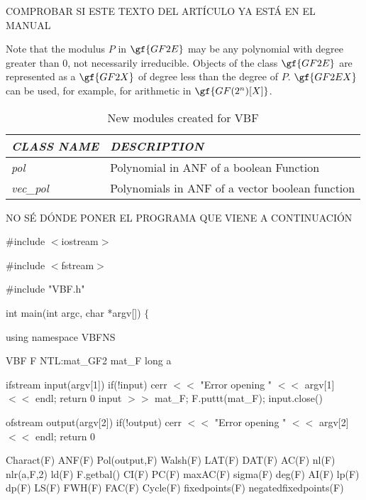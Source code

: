 {{{{{{{COMPROBAR SI ESTE TEXTO DEL ART\'ICULO YA EST\'A EN EL MANUAL


Note that the modulus $P$ in $\gf{GF2E}$ may be any polynomial with degree
greater than $0$, not necessarily irreducible. Objects of the class $\gf{GF2E}$ are
represented as a $\gf{GF2X}$ of degree less than the degree of $P$. $\gf{GF2EX}$
can be used, for example, for arithmetic in $\gf{GF(2^n)[X]}$. 

\begin{table}[htbp]%
\caption{New modules created for VBF\label{tab:NewModules}}{
\begin{tabular}{|l|l|}
\hline
\em{CLASS NAME} & \em{DESCRIPTION} \\\hline
\textsl{pol} & Polynomial in ANF of a boolean Function \\\hline
\textsl{vec\_pol} & Polynomials in ANF of a vector boolean function \\\hline
\end{tabular}}
\end{table}%






NO S\'E D\'ONDE PONER EL PROGRAMA QUE VIENE A CONTINUACI\'ON



\begin{algorithm}[t]
\SetAlgoNoLine
$\#$include $<$iostream$>$

$\#$include $<$fstream$>$

$\#$include "VBF.h"

int main(int argc, char *argv[]) $\{$

   using namespace VBFNS\;
	  
   VBF          F\;
   NTL\::mat\_GF2 mat\_F\;
   long a\;

   ifstream input(argv[1])\; 
   if(!input)
     cerr $<<$ "Error opening " $<<$ argv[1] $<<$ endl; return 0\;
   input $>>$ mat\_F; F.puttt(mat\_F); input.close()\;

   ofstream output(argv[2])\;
   if(!output)	
     cerr $<<$ "Error opening " $<<$ argv[2] $<<$ endl; return 0\;
   
   Charact(F)\;
   ANF(F)\;
   Pol(output,F)\;
   Walsh(F)\;
   LAT(F)\;
   DAT(F)\;
   AC(F)\;
   nl(F)\;
   nlr(a,F,2)\;
   ld(F)\;
   F.getbal()\;
   CI(F)\;
   PC(F)\;
   maxAC(F)\;
   sigma(F)\;
   deg(F)\;
   AI(F)\;
   lp(F)\;
   dp(F)\;
   LS(F)\;
   FWH(F)\;
   FAC(F)\;
   Cycle(F)\;
   fixedpoints(F)\;
   negatedfixedpoints(F)\;
	  

\end{algorithm}}}}}}}}
